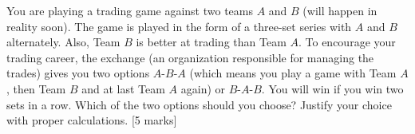 
\begin{que}
	You are playing a trading game against two teams $A$ and $B$ (will happen
	in reality soon). The game is played in the form of a three-set series
	with $A$ and $B$ alternately. Also, Team $B$ is better at trading than Team
	$A$. To encourage your trading career, the exchange (an organization
	responsible for managing the trades) gives you two options $A$-$B$-$A$ (which
	means you play a game with Team $A$, then Team $B$ and at last Team $A$
	again) or $B$-$A$-$B$. You will win if you win two sets in a row. Which of
	the two options should you choose? Justify your choice with proper
	calculations.
	\hspace*{\fill} [5 marks]
\end{que}

\begin{tcolorbox}
	\begin{sol}
	\end{sol}
\end{tcolorbox}
